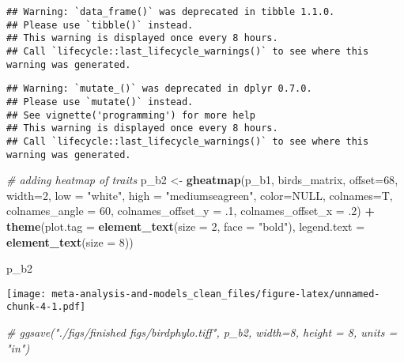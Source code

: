 \documentclass[]{article}
\newenvironment{Shaded}{\begin{snugshade}}{\end{snugshade}}
\newcommand{\KeywordTok}[1]{\textcolor[rgb]{0.13,0.29,0.53}{\textbf{#1}}}
\newcommand{\DataTypeTok}[1]{\textcolor[rgb]{0.13,0.29,0.53}{#1}}
\newcommand{\DecValTok}[1]{\textcolor[rgb]{0.00,0.00,0.81}{#1}}
\newcommand{\StringTok}[1]{\textcolor[rgb]{0.31,0.60,0.02}{#1}}
\newcommand{\CommentTok}[1]{\textcolor[rgb]{0.56,0.35,0.01}{\textit{#1}}}
\newcommand{\OtherTok}[1]{\textcolor[rgb]{0.56,0.35,0.01}{#1}}
\newcommand{\OperatorTok}[1]{\textcolor[rgb]{0.81,0.36,0.00}{\textbf{#1}}}
\newcommand{\NormalTok}[1]{#1}
\begin{document}
\begin{verbatim}
## Warning: `data_frame()` was deprecated in tibble 1.1.0.
## Please use `tibble()` instead.
## This warning is displayed once every 8 hours.
## Call `lifecycle::last_lifecycle_warnings()` to see where this warning was generated.
\end{verbatim}

\begin{verbatim}
## Warning: `mutate_()` was deprecated in dplyr 0.7.0.
## Please use `mutate()` instead.
## See vignette('programming') for more help
## This warning is displayed once every 8 hours.
## Call `lifecycle::last_lifecycle_warnings()` to see where this warning was generated.
\end{verbatim}

\begin{Shaded}
\begin{Highlighting}[]
  \CommentTok{# adding heatmap of traits}
\NormalTok{p_b2 <-}\StringTok{ }\KeywordTok{gheatmap}\NormalTok{(p_b1, birds_matrix, }\DataTypeTok{offset=}\DecValTok{68}\NormalTok{, }\DataTypeTok{width=}\DecValTok{2}\NormalTok{, }\DataTypeTok{low =} \StringTok{"white"}\NormalTok{, }\DataTypeTok{high =} \StringTok{"mediumseagreen"}\NormalTok{, }\DataTypeTok{color=}\OtherTok{NULL}\NormalTok{,}
                 \DataTypeTok{colnames=}\NormalTok{T, }\DataTypeTok{colnames_angle =} \DecValTok{60}\NormalTok{, }\DataTypeTok{colnames_offset_y =}\NormalTok{ .}\DecValTok{1}\NormalTok{, }\DataTypeTok{colnames_offset_x =}\NormalTok{ .}\DecValTok{2}\NormalTok{) }\OperatorTok{+}
\StringTok{  }\KeywordTok{theme}\NormalTok{(}\DataTypeTok{plot.tag =} \KeywordTok{element_text}\NormalTok{(}\DataTypeTok{size =} \DecValTok{2}\NormalTok{, }\DataTypeTok{face =} \StringTok{"bold"}\NormalTok{),}
        \DataTypeTok{legend.text =} \KeywordTok{element_text}\NormalTok{(}\DataTypeTok{size =} \DecValTok{8}\NormalTok{))}

\NormalTok{p_b2}
\end{Highlighting}
\end{Shaded}

\texttt{[image: meta-analysis-and-models\_clean\_files/figure-latex/unnamed-chunk-4-1.pdf]}

\begin{Shaded}
\begin{Highlighting}[]
\CommentTok{# ggsave("./figs/finished figs/birdphylo.tiff", p_b2, width=8, height = 8, units = "in")}
\end{Highlighting}
\end{Shaded}
\end{document}
